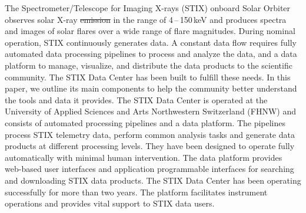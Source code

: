 \documentclass[referee]{aa} %
\providecommand{\DIFaddtex}[1]{{\protect\color{blue}\uwave{#1}}} %
\providecommand{\DIFdeltex}[1]{{\protect\color{red}\sout{#1}}}                      %
\providecommand{\DIFaddbegin}{} %
\providecommand{\DIFaddend}{} %
\providecommand{\DIFdelbegin}{} %
\providecommand{\DIFdelend}{} %
\providecommand{\DIFadd}[1]{\texorpdfstring{\DIFaddtex{#1}}{#1}} %
\providecommand{\DIFdel}[1]{\texorpdfstring{\DIFdeltex{#1}}{}} %
\newcommand{\DIFscaledelfig}{0.5}
\newlength{\DIFdelgraphicswidth} %
\newlength{\DIFdelgraphicsheight} %
\newcommand{\DIFaddincludegraphics}[2][]{{\color{blue}\fbox{\DIFOincludegraphics[#1]{#2}}}} %
\newcommand{\DIFdelincludegraphics}[2][]{%
\sbox{\DIFdelgraphicsbox}{\DIFOincludegraphics[#1]{#2}}%
\settoboxwidth{\DIFdelgraphicswidth}{\DIFdelgraphicsbox} %
\settoboxtotalheight{\DIFdelgraphicsheight}{\DIFdelgraphicsbox} %
\scalebox{\DIFscaledelfig}{%
\parbox[b]{\DIFdelgraphicswidth}{\usebox{\DIFdelgraphicsbox}\\[-\baselineskip] \rule{\DIFdelgraphicswidth}{0em}}\llap{\resizebox{\DIFdelgraphicswidth}{\DIFdelgraphicsheight}{%
\setlength{\unitlength}{\DIFdelgraphicswidth}%
\begin{picture}(1,1)%
\thicklines\linethickness{2pt} %
{\color[rgb]{1,0,0}\put(0,0){\framebox(1,1){}}}%
{\color[rgb]{1,0,0}\put(0,0){\line( 1,1){1}}}%
{\color[rgb]{1,0,0}\put(0,1){\line(1,-1){1}}}%
\end{picture}%
}\hspace*{3pt}}} %
} %
\DeclareRobustCommand{\DIFaddbegin}{\DIFOaddbegin \let\includegraphics\DIFaddincludegraphics} %
\DeclareRobustCommand{\DIFaddend}{\DIFOaddend \let\includegraphics\DIFOincludegraphics} %
\DeclareRobustCommand{\DIFdelbegin}{\DIFOdelbegin \let\includegraphics\DIFdelincludegraphics} %
\DeclareRobustCommand{\DIFdelend}{\DIFOaddend \let\includegraphics\DIFOincludegraphics} %
\begin{document}
   \date{\today}


  \abstract
   {The Spectrometer/Telescope for Imaging X-rays (STIX) onboard Solar Orbiter observes solar X-ray \DIFdelbegin \DIFdel{emission }\DIFdelend \DIFaddbegin \DIFadd{emissions }\DIFaddend in the range of 4\,--\,150\,keV and produces spectra and images of solar flares over a wide range of flare magnitudes.  During nominal operation, STIX continuously generates data. 
   A constant data flow requires fully automated data processing pipelines to process and analyze the data, and a data platform to manage, visualize, and distribute the data products to the scientific community.  
   } %
   {The STIX Data Center has been built to fulfill these needs.  In this paper, we outline its main components to help the community better understand the tools and data it provides.
   }
   {
   The STIX Data Center is operated at the University of Applied Sciences and Arts Northwestern Switzerland (FHNW) and consists of automated processing pipelines and a data platform.  The pipelines process STIX telemetry data, perform common analysis tasks and generate data products at different processing levels. They have been designed to operate fully automatically with minimal human intervention.  The data platform provides web-based user interfaces and application programmable interfaces for searching and downloading STIX data products.
   }
   {
   The STIX Data Center has been operating successfully for more than two years. The platform facilitates instrument operations and provides vital support to STIX data users.}
 {}
   \maketitle
\end{document}
